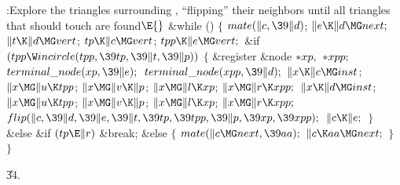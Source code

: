 \Y\B\4:Explore the triangles surrounding , ``flipping'' their
neighbors until all triangles that should touch  are found\X${}\E{}$\6
\&{while} ()\5
${}\{{}$\1\6
${}\\{mate}(\|c,\39\|d){}$;\5
${}\|e\K\|d\MG\\{next};{}$\6
${}\|t\K\|d\MG\\{vert}{}$;\5
${}\\{tp}\K\|c\MG\\{vert}{}$;\5
${}\\{tpp}\K\|e\MG\\{vert};{}$\6
\&{if} ${}(\\{tpp}\W\\{incircle}(\\{tpp},\39\\{tp},\39\|t,\39\|p)){}$\5
${}\{{}$\1\6
\&{register} \&{node} ${}{*}\\{xp},{}$ ${}{*}\\{xpp};{}$\7
${}\\{terminal\_node}(\\{xp},\39\|e);{}$\6
${}\\{terminal\_node}(\\{xpp},\39\|d);{}$\6
${}\|x\K\|c\MG\\{inst}{}$;\5
${}\|x\MG\|u\K\\{tpp}{}$;\5
${}\|x\MG\|v\K\|p{}$;\5
${}\|x\MG\|l\K\\{xp}{}$;\5
${}\|x\MG\|r\K\\{xpp};{}$\6
${}\|x\K\|d\MG\\{inst}{}$;\5
${}\|x\MG\|u\K\\{tpp}{}$;\5
${}\|x\MG\|v\K\|p{}$;\5
${}\|x\MG\|l\K\\{xp}{}$;\5
${}\|x\MG\|r\K\\{xpp};{}$\6
${}\\{flip}(\|c,\39\|d,\39\|e,\39\|t,\39\\{tp},\39\\{tpp},\39\|p,\39\\{xp},\39%
\\{xpp});{}$\6
${}\|c\K\|e;{}$\6
\4${}\}{}$\2\6
\&{else} \&{if} ${}(\\{tp}\E\|r){}$\1\5
\&{break};\2\6
\&{else}\5
${}\{{}$\1\6
${}\\{mate}(\|c\MG\\{next},\39\\{aa});{}$\6
${}\|c\K\\{aa}\MG\\{next};{}$\6
\4${}\}{}$\2\6
\4${}\}{}$\2\par
\U34.\fi

